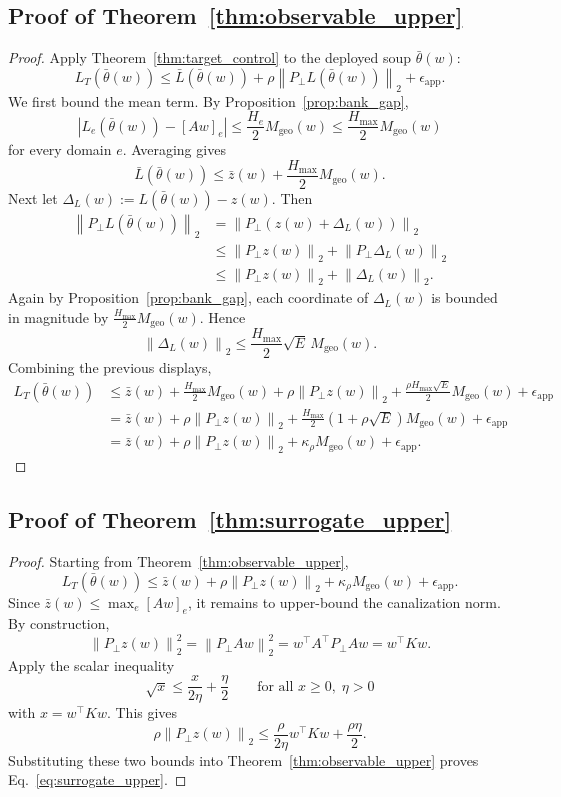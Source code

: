 \documentclass{article}
\theoremstyle{definition}
\newcommand{\norm}[1]{\left\lVert #1 \right\rVert}
\newcommand{\abs}[1]{\left\lvert #1 \right\rvert}
\newcommand{\paren}[1]{\left( #1 \right)}
\newcommand{\thetaw}{\bar{\theta}(w)}
\begin{document}
\subsection{Proof of Theorem~\ref{thm:observable_upper}}

\begin{proof}
Apply Theorem~\ref{thm:target_control} to the deployed soup \(\thetaw\):
\[
L_T(\thetaw)
\le
\bar L(\thetaw)+\rho\norm{P_\perp L(\thetaw)}_2+\epsilon_{\mathrm{app}}.
\]
We first bound the mean term. By Proposition~\ref{prop:bank_gap},
\[
\abs{L_e(\thetaw)-[Aw]_e}\le \frac{H_e}{2}M_{\mathrm{geo}}(w)\le \frac{H_{\max}}{2}M_{\mathrm{geo}}(w)
\]
for every domain \(e\). Averaging gives
\[
\bar L(\thetaw)
\le
\bar z(w)+\frac{H_{\max}}{2}M_{\mathrm{geo}}(w).
\]
Next let \(\Delta_L(w):=L(\thetaw)-z(w)\). Then
\begin{align*}
\norm{P_\perp L(\thetaw)}_2
&=
\norm{P_\perp(z(w)+\Delta_L(w))}_2 \\
&\le
\norm{P_\perp z(w)}_2+\norm{P_\perp \Delta_L(w)}_2 \\
&\le
\norm{P_\perp z(w)}_2+\norm{\Delta_L(w)}_2.
\end{align*}
Again by Proposition~\ref{prop:bank_gap}, each coordinate of \(\Delta_L(w)\) is bounded in magnitude by \(\frac{H_{\max}}{2}M_{\mathrm{geo}}(w)\). Hence
\[
\norm{\Delta_L(w)}_2
\le
\frac{H_{\max}}{2}\sqrt{E}\,M_{\mathrm{geo}}(w).
\]
Combining the previous displays,
\begin{align*}
L_T(\thetaw)
&\le
\bar z(w)+\frac{H_{\max}}{2}M_{\mathrm{geo}}(w)
+ \rho\norm{P_\perp z(w)}_2
+ \frac{\rho H_{\max}\sqrt E}{2}M_{\mathrm{geo}}(w)
+ \epsilon_{\mathrm{app}} \\
&=
\bar z(w)+\rho\norm{P_\perp z(w)}_2+\frac{H_{\max}}{2}\paren{1+\rho\sqrt E}M_{\mathrm{geo}}(w)+\epsilon_{\mathrm{app}} \\
&=
\bar z(w)+\rho\norm{P_\perp z(w)}_2+\kappa_\rho M_{\mathrm{geo}}(w)+\epsilon_{\mathrm{app}}.
\end{align*}
\end{proof}

\subsection{Proof of Theorem~\ref{thm:surrogate_upper}}

\begin{proof}
Starting from Theorem~\ref{thm:observable_upper},
\[
L_T(\thetaw)
\le
\bar z(w)+\rho\norm{P_\perp z(w)}_2+\kappa_\rho M_{\mathrm{geo}}(w)+\epsilon_{\mathrm{app}}.
\]
Since \(\bar z(w)\le \max_e [Aw]_e\), it remains to upper-bound the canalization norm. By construction,
\[
\norm{P_\perp z(w)}_2^2
=
\norm{P_\perp Aw}_2^2
=
w^\top A^\top P_\perp A w
=
w^\top K w.
\]
Apply the scalar inequality
\[
\sqrt{x}\le \frac{x}{2\eta}+\frac{\eta}{2}
\qquad
\text{for all } x\ge 0,\; \eta>0
\]
with \(x=w^\top K w\). This gives
\[
\rho\norm{P_\perp z(w)}_2
\le
\frac{\rho}{2\eta}w^\top K w+\frac{\rho\eta}{2}.
\]
Substituting these two bounds into Theorem~\ref{thm:observable_upper} proves Eq.~\eqref{eq:surrogate_upper}.
\end{proof}
\end{document}
